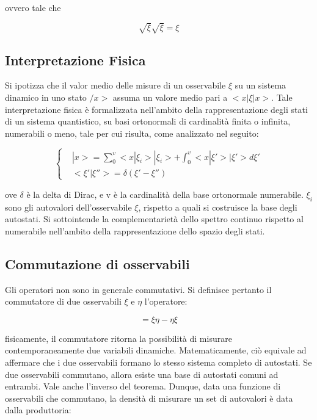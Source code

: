 \documentclass{article}
\begin{document}
ovvero tale che

\begin{equation}
    \sqrt{\xi}\sqrt{\xi}=\xi
\end{equation}


\subsection{Interpretazione Fisica}
Si ipotizza che il valor medio delle misure di un osservabile $\xi$ su un sistema dinamico in uno stato $/x>$
assuma un valore medio pari a $<x|\xi|x>$.
Tale interpretazione fisica è formalizzata nell'ambito della rappresentazione degli stati di un sistema quantistico,
su basi ortonormali di cardinalità finita o infinita, numerabili o meno, tale per cui risulta, come analizzato nel seguito:

\begin{equation}
    \left\{
    \begin{aligned}
         & |x>= \sum_{0}^{v} <x|\xi_i>|\xi_i>+ \int_{0}^{v} <x|\xi'>|\xi'>d\xi' \\
         & <\xi' | \xi''>= \delta(\xi'-\xi'')
    \end{aligned}
    \right.
\end{equation}

ove $\delta$ è la delta di Dirac, e v è la cardinalità della base ortonormale numerabile. $\xi_i$ sono gli autovalori dell'osservabile $\xi$, rispetto a quali si costruisce la base degli autostati.
Si sottointende la complementarietà dello spettro continuo rispetto al numerabile nell'ambito della rappresentazione dello spazio degli stati.


\subsection{Commutazione di osservabili}
Gli operatori non sono in generale commutativi.
Si definisce pertanto il commutatore di due osservabili $\xi$ e $\eta$ l'operatore:

\begin{equation}
    [\xi,\eta]=\xi\eta-\eta\xi
\end{equation}

fisicamente, il commutatore ritorna la possibilità di misurare contemporaneamente due variabili dinamiche.
Matematicamente, ciò equivale ad affermare che i due osservabili formano lo stesso sistema completo di autostati.
Se due osservabili commutano, allora esiste una base di autostati comuni ad entrambi.
Vale anche l'inverso del teorema.
Dunque, data una funzione di osservabili che commutano, la densità di misurare un set di autovalori è data dalla produttoria:
\end{document}
